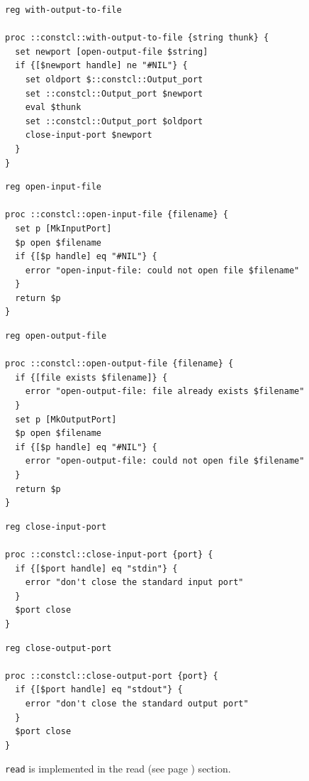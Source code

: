 \documentclass[twoside,9pt]{report}
\begin{document}
\noindent\makebox[\linewidth]{\rule{\linewidth}{0.4pt}}
\noindent\makebox[\linewidth]{\rule{\linewidth}{0.4pt}}
\begin{lstlisting}
reg with-output-to-file
 
proc ::constcl::with-output-to-file {string thunk} {
  set newport [open-output-file $string]
  if {[$newport handle] ne "#NIL"} {
    set oldport $::constcl::Output_port
    set ::constcl::Output_port $newport
    eval $thunk
    set ::constcl::Output_port $oldport
    close-input-port $newport
  }
}
\end{lstlisting}
\noindent\makebox[\linewidth]{\rule{\linewidth}{0.4pt}}
\noindent\makebox[\linewidth]{\rule{\linewidth}{0.4pt}}
\begin{lstlisting}
reg open-input-file
 
proc ::constcl::open-input-file {filename} {
  set p [MkInputPort]
  $p open $filename
  if {[$p handle] eq "#NIL"} {
    error "open-input-file: could not open file $filename"
  }
  return $p
}
\end{lstlisting}
\noindent\makebox[\linewidth]{\rule{\linewidth}{0.4pt}}
\noindent\makebox[\linewidth]{\rule{\linewidth}{0.4pt}}
\begin{lstlisting}
reg open-output-file
 
proc ::constcl::open-output-file {filename} {
  if {[file exists $filename]} {
    error "open-output-file: file already exists $filename"
  }
  set p [MkOutputPort]
  $p open $filename
  if {[$p handle] eq "#NIL"} {
    error "open-output-file: could not open file $filename"
  }
  return $p
}
\end{lstlisting}
\noindent\makebox[\linewidth]{\rule{\linewidth}{0.4pt}}
\noindent\makebox[\linewidth]{\rule{\linewidth}{0.4pt}}
\begin{lstlisting}
reg close-input-port
 
proc ::constcl::close-input-port {port} {
  if {[$port handle] eq "stdin"} {
    error "don't close the standard input port"
  }
  $port close
}
\end{lstlisting}
\noindent\makebox[\linewidth]{\rule{\linewidth}{0.4pt}}
\noindent\makebox[\linewidth]{\rule{\linewidth}{0.4pt}}
\begin{lstlisting}
reg close-output-port
 
proc ::constcl::close-output-port {port} {
  if {[$port handle] eq "stdout"} {
    error "don't close the standard output port"
  }
  $port close
}
\end{lstlisting}
\noindent\makebox[\linewidth]{\rule{\linewidth}{0.4pt}}

\texttt{read} is implemented in the read (see page \pageref{read}) section.
\end{document}
